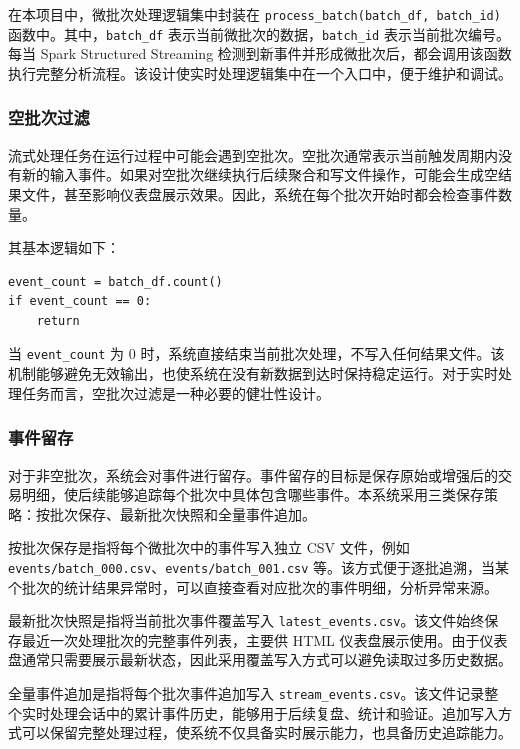 \documentclass[12pt,hyperref,a4paper,UTF8]{ctexart}
\begin{document}
在本项目中，微批次处理逻辑集中封装在 \texttt{process\_batch(batch\_df, batch\_id)} 函数中。其中，\texttt{batch\_df} 表示当前微批次的数据，\texttt{batch\_id} 表示当前批次编号。每当 Spark Structured Streaming 检测到新事件并形成微批次后，都会调用该函数执行完整分析流程。该设计使实时处理逻辑集中在一个入口中，便于维护和调试。

\subsubsection{空批次过滤}

流式处理任务在运行过程中可能会遇到空批次。空批次通常表示当前触发周期内没有新的输入事件。如果对空批次继续执行后续聚合和写文件操作，可能会生成空结果文件，甚至影响仪表盘展示效果。因此，系统在每个批次开始时都会检查事件数量。

其基本逻辑如下：

\begin{verbatim}
event_count = batch_df.count()
if event_count == 0:
    return
\end{verbatim}

当 \texttt{event\_count} 为 0 时，系统直接结束当前批次处理，不写入任何结果文件。该机制能够避免无效输出，也使系统在没有新数据到达时保持稳定运行。对于实时处理任务而言，空批次过滤是一种必要的健壮性设计。

\subsubsection{事件留存}

对于非空批次，系统会对事件进行留存。事件留存的目标是保存原始或增强后的交易明细，使后续能够追踪每个批次中具体包含哪些事件。本系统采用三类保存策略：按批次保存、最新批次快照和全量事件追加。

按批次保存是指将每个微批次中的事件写入独立 CSV 文件，例如 \texttt{events/batch\_000.csv}、\texttt{events/batch\_001.csv} 等。该方式便于逐批追溯，当某个批次的统计结果异常时，可以直接查看对应批次的事件明细，分析异常来源。

最新批次快照是指将当前批次事件覆盖写入 \texttt{latest\_events.csv}。该文件始终保存最近一次处理批次的完整事件列表，主要供 HTML 仪表盘展示使用。由于仪表盘通常只需要展示最新状态，因此采用覆盖写入方式可以避免读取过多历史数据。

全量事件追加是指将每个批次事件追加写入 \texttt{stream\_events.csv}。该文件记录整个实时处理会话中的累计事件历史，能够用于后续复盘、统计和验证。追加写入方式可以保留完整处理过程，使系统不仅具备实时展示能力，也具备历史追踪能力。
\end{document}
